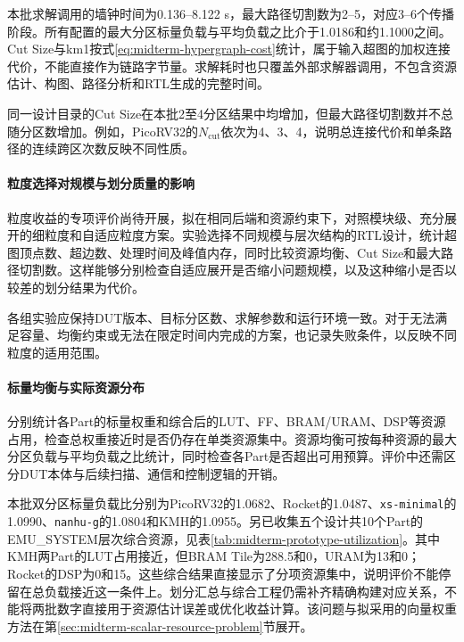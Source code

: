 本批求解调用的墙钟时间为0.136--8.122 s，最大路径切割数为2--5，对应3--6个传播阶段。所有配置的最大分区标量负载与平均负载之比介于1.0186和约1.1000之间。Cut Size与km1按式\eqref{eq:midterm-hypergraph-cost}统计，属于输入超图的加权连接代价，不能直接作为链路字节量。求解耗时也只覆盖外部求解器调用，不包含资源估计、构图、路径分析和RTL生成的完整时间。

同一设计目录的Cut Size在本批2至4分区结果中均增加，但最大路径切割数并不总随分区数增加。例如，PicoRV32的$N_{\mathrm{cut}}$依次为4、3、4，说明总连接代价和单条路径的连续跨区次数反映不同性质。


\paragraph{粒度选择对规模与划分质量的影响}

粒度收益的专项评价尚待开展，拟在相同后端和资源约束下，对照模块级、充分展开的细粒度和自适应粒度方案。实验选择不同规模与层次结构的RTL设计，统计超图顶点数、超边数、处理时间及峰值内存，同时比较资源均衡、Cut Size和最大路径切割数。这样能够分别检查自适应展开是否缩小问题规模，以及这种缩小是否以较差的划分结果为代价。

各组实验应保持DUT版本、目标分区数、求解参数和运行环境一致。对于无法满足容量、均衡约束或无法在限定时间内完成的方案，也记录失败条件，以反映不同粒度的适用范围。


\paragraph{标量均衡与实际资源分布}

分别统计各Part的标量权重和综合后的LUT、FF、BRAM/URAM、DSP等资源占用，检查总权重接近时是否仍存在单类资源集中。资源均衡可按每种资源的最大分区负载与平均负载之比统计，同时检查各Part是否超出可用预算。评价中还需区分DUT本体与后续扫描、通信和控制逻辑的开销。

本批双分区标量负载比分别为PicoRV32的1.0682、Rocket的1.0487、\texttt{xs-minimal}的1.0990、\texttt{nanhu-g}的1.0804和KMH的1.0955。另已收集五个设计共10个Part的EMU\_SYSTEM层次综合资源，见表\ref{tab:midterm-prototype-utilization}。其中KMH两Part的LUT占用接近，但BRAM Tile为288.5和0，URAM为13和0；Rocket的DSP为0和15。这些综合结果直接显示了分项资源集中，说明评价不能停留在总负载接近这一条件上。划分汇总与综合工程仍需补齐精确构建对应关系，不能将两批数字直接用于资源估计误差或优化收益计算。该问题与拟采用的向量权重方法在第\ref{sec:midterm-scalar-resource-problem}节展开。


